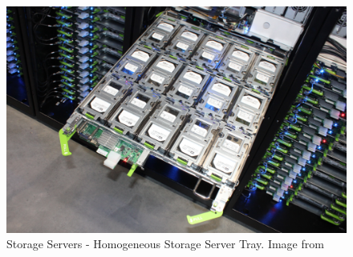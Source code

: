 \begin{figure} [!h]
\centering
\includegraphics[scale=.3]{methodology/images/storage_tray.png}
\caption[Storage Servers]{Storage Servers - Homogeneous Storage Server Tray.  Image from \cite{cisco_storage}}
\label{img_storage_tray}
\end{figure}
